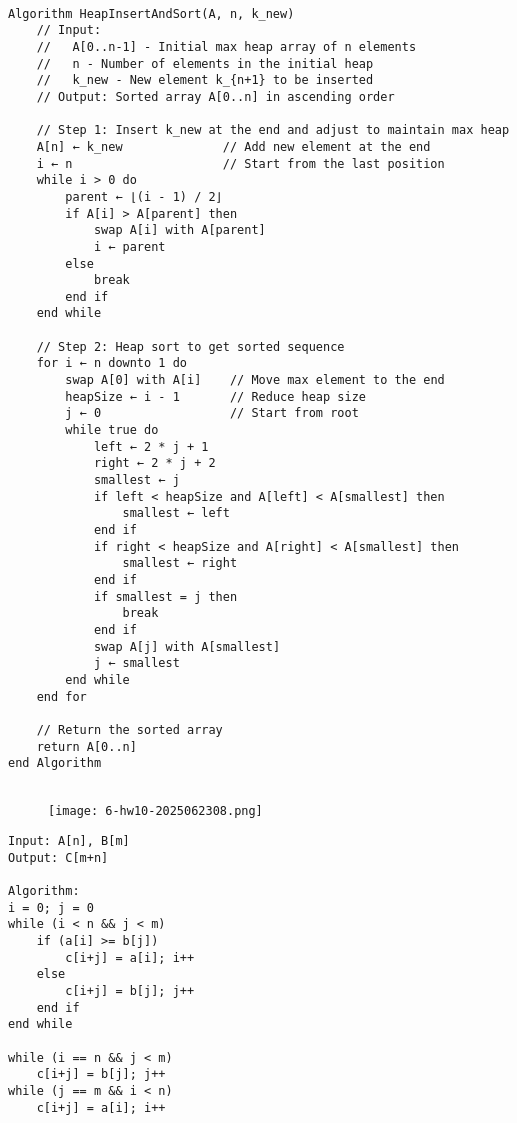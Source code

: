 \begin{lstlisting}

Algorithm HeapInsertAndSort(A, n, k_new)
    // Input: 
    //   A[0..n-1] - Initial max heap array of n elements
    //   n - Number of elements in the initial heap
    //   k_new - New element k_{n+1} to be inserted
    // Output: Sorted array A[0..n] in ascending order

    // Step 1: Insert k_new at the end and adjust to maintain max heap
    A[n] ← k_new              // Add new element at the end
    i ← n                     // Start from the last position
    while i > 0 do
        parent ← ⌊(i - 1) / 2⌋
        if A[i] > A[parent] then
            swap A[i] with A[parent]
            i ← parent
        else
            break
        end if
    end while

    // Step 2: Heap sort to get sorted sequence
    for i ← n downto 1 do
        swap A[0] with A[i]    // Move max element to the end
        heapSize ← i - 1       // Reduce heap size
        j ← 0                  // Start from root
        while true do
            left ← 2 * j + 1
            right ← 2 * j + 2
            smallest ← j
            if left < heapSize and A[left] < A[smallest] then
                smallest ← left
            end if
            if right < heapSize and A[right] < A[smallest] then
                smallest ← right
            end if
            if smallest = j then
                break
            end if
            swap A[j] with A[smallest]
            j ← smallest
        end while
    end for

    // Return the sorted array
    return A[0..n]
end Algorithm


\end{lstlisting}
\begin{exercise}
\begin{figure}[H]
\centering
\texttt{[image: 6-hw10-2025062308.png]}
\label{}
\end{figure}
\end{exercise}
\begin{lstlisting}
Input: A[n], B[m]
Output: C[m+n]

Algorithm:
i = 0; j = 0
while (i < n && j < m)
    if (a[i] >= b[j])
        c[i+j] = a[i]; i++
    else 
        c[i+j] = b[j]; j++
    end if
end while

while (i == n && j < m)
    c[i+j] = b[j]; j++
while (j == m && i < n)
    c[i+j] = a[i]; i++

\end{lstlisting}